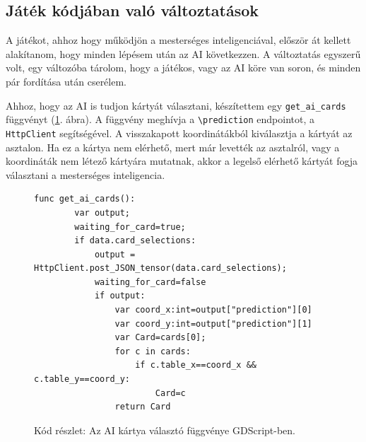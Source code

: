 \subsection{Játék kódjában való változtatások}

A játékot, ahhoz hogy működjön a mesterséges inteligenciával, először át kellett alakítanom, hogy minden lépésem után az AI következzen. A változtatás egyszerű volt, egy változóba tárolom, hogy a játékos, vagy az AI köre van soron, és minden pár fordítása után cserélem. 

Ahhoz, hogy az AI is tudjon kártyát választani, készítettem egy \lstinline{get_ai_cards} függvényt (\ref{code:get_ai_card}. ábra). A függvény meghívja a \lstinline{\prediction} endpointot, a \lstinline{HttpClient} segítségével. A visszakapott koordinátákból kiválasztja a kártyát az asztalon. 
Ha ez a kártya nem elérhető, mert már levették az asztalról, vagy a koordináták nem létező kártyára mutatnak, akkor a legelső elérhető kártyát fogja választani a mesterséges inteligencia. 

\begin{figure}[H]
    \centering
    \begin{lstlisting}[language=GDScript]
func get_ai_cards():
        var output;
        waiting_for_card=true;
        if data.card_selections:
            output = HttpClient.post_JSON_tensor(data.card_selections);
            waiting_for_card=false
            if output:
                var coord_x:int=output["prediction"][0]
                var coord_y:int=output["prediction"][1]
                var Card=cards[0];
                for c in cards:
                    if c.table_x==coord_x && c.table_y==coord_y:
                        Card=c
                return Card
    \end{lstlisting}
    \caption{Kód részlet: Az AI kártya választó függvénye GDScript-ben.}
    \label{code:get_ai_card}
\end{figure}
